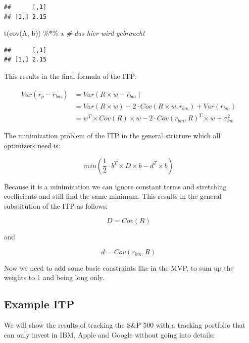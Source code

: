 \documentclass[
  oneside]{book}
\newenvironment{Shaded}{\begin{snugshade}}{\end{snugshade}}
\newcommand{\CommentTok}[1]{\textcolor[rgb]{0.56,0.35,0.01}{\textit{#1}}}
\newcommand{\FunctionTok}[1]{\textcolor[rgb]{0.00,0.00,0.00}{#1}}
\newcommand{\NormalTok}[1]{#1}
\newcommand{\SpecialCharTok}[1]{\textcolor[rgb]{0.00,0.00,0.00}{#1}}
\begin{document}
\begin{verbatim}
##      [,1]
## [1,] 2.15
\end{verbatim}

\begin{Shaded}
\begin{Highlighting}[]
\FunctionTok{t}\NormalTok{(}\FunctionTok{cov}\NormalTok{(A, b)) }\SpecialCharTok{\%*\%}\NormalTok{ a }\CommentTok{\# das hier wird gebraucht}
\end{Highlighting}
\end{Shaded}

\begin{verbatim}
##      [,1]
## [1,] 2.15
\end{verbatim}

This results in the final formula of the ITP:

\begin{equation}
  \begin{split}
   Var(r_{p}-r_{bm}) & = Var(R \times w - r_{bm}) \\
   & = Var(R \times w) - 2 \cdot Cov(R \times w,r_{bm}) + Var(r_{bm})  \\
   & = w^T \times Cov(R) \times w - 2 \cdot Cov(r_{bm}, R)^T \times w + \sigma_{bm}^2
   \end{split}
   \label{eq:ITP}
\end{equation}

The minimization problem of the ITP in the general stricture which all optimizers need is:

\[
  min(\frac{1}{2} \cdot b^T \times D \times b -d^T \times b)
\]

Because it is a minimization we can ignore constant terms and stretching coefficients and still find the same minimum. This results in the general substitution of the ITP as follows:

\[
  D = Cov(R)
\]

and

\[
d = Cov(r_{bm}, R)
\]

Now we need to add some basic constraints like in the MVP, to sum up the weights to 1 and being long only.

\hypertarget{example-itp}{%
\subsection{Example ITP}\label{example-itp}}

We will show the results of tracking the S\&P 500 with a tracking portfolio that can only invest in IBM, Apple and Google without going into details:
\end{document}
